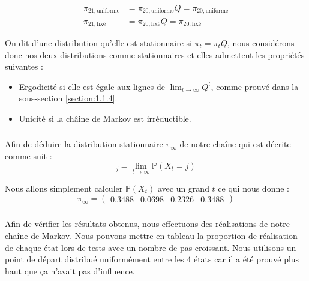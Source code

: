 \begin{align*}
  \pi_{21,\text{uniforme}} &= \pi_{20,\text{uniforme}} Q = \pi_{20,\text{uniforme}}\\
  \pi_{21,\text{fixé}} &= \pi_{20,\text{fixé}} Q = \pi_{20,\text{fixé}} 
\end{align*}

On dit d'une distribution qu'elle est stationnaire si $\pi_t = \pi_t Q$, nous considérons donc nos deux distributions comme stationnaires et elles admettent les propriétés suivantes :\\
\begin{itemize}
  \item Ergodicité si elle est égale aux lignes de $\lim_{t \rightarrow \infty} Q^t$, comme prouvé dans la sous-section \ref{section:1.1.4}.
  \item Unicité si la châine de Markov est irréductible.
\end{itemize}

\subsubsection{}

Afin de déduire la distribution stationnaire $\pi_{\infty}$ de notre chaîne qui est décrite comme suit :
\begin{equation*}
  [\pi_\infty]_j = \lim_{t \rightarrow \infty} \mathbb{P}(X_t = j)
\end{equation*}

Nous allons simplement calculer $\mathbb{P}(X_t)$ avec un grand $t$ ce qui nous donne :
\begin{equation*}
  \pi_{\infty} = 
  \begin{pmatrix}
    0.3488 & 0.0698 & 0.2326 & 0.3488
  \end{pmatrix}
\end{equation*}
\newpage
\subsubsection{}
Afin de vérifier les résultats obtenus, nous effectuons des réalisations de notre chaîne de Markov. Nous pouvons mettre en tableau la proportion de réalisation 
de chaque état lors de tests avec un nombre de pas croissant. Nous utilisons un point de départ distribué uniformément entre les 4 états car il a été prouvé
plus haut que ça n'avait pas d'influence.

